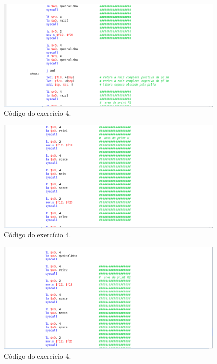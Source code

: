 \documentclass[12pt]{article}
\begin{document}
\begin{figure}[H]
	\centering
	\includegraphics[width=1\textwidth]{EX_4_9.png}
	\caption{Código do exercício 4.}
	\label{fig:hilo9}
\end{figure}

\begin{figure}[H]
	\centering
	\includegraphics[width=1\textwidth]{EX_4_10.png}
	\caption{Código do exercício 4.}
	\label{fig:hilo10}
\end{figure}

\begin{figure}[H]
	\centering
	\includegraphics[width=1\textwidth]{EX_4_11.png}
	\caption{Código do exercício 4.}
	\label{fig:hilo11}
\end{figure}
\end{document}
